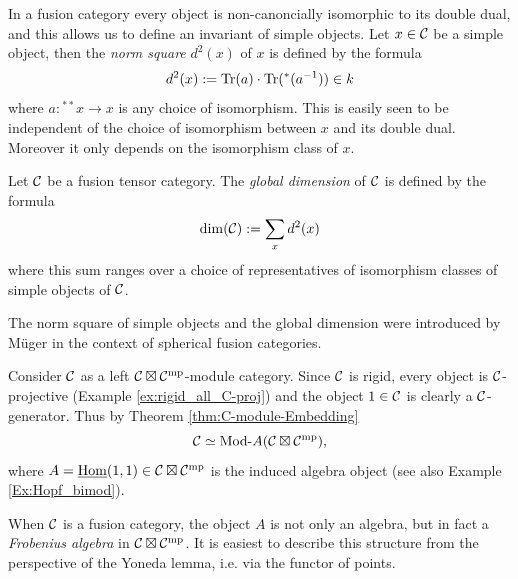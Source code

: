 \documentclass{amsart}
\begin{document}
In a fusion category every object is non-canoncially isomorphic to its double dual, and this allows us to define an invariant of simple objects. Let $x \in \mathcal C$ be a simple object, then the {\em norm square} $d^2(x)$ of $x$ is defined by the formula 
\begin{equation*}
	d^2(x) := \mathrm{Tr}(a) \cdot \mathrm{Tr}({}^*(a^{-1})) \in k
\end{equation*}
where $a: {}^{**}x \to x$ is any choice of isomorphism. This is easily seen to be independent of the choice of isomorphism between $x$ and its double dual. Moreover it only depends on the isomorphism class of $x$. 
\begin{definition}
	Let $\mathcal C$ be a fusion tensor category. The {\em global dimension} of $\mathcal C$ is defined by the formula
	\begin{equation*}
		\dim(\mathcal C) := \sum_{x} d^2(x)
	\end{equation*}
	where this sum ranges over a choice of representatives of isomorphism classes of simple objects of $\mathcal C$. 
\end{definition}
\noindent The norm square of simple objects and the global dimension were introduced by M\"uger \cite{MR1966524} in the context of spherical fusion categories.

Consider $\mathcal C$ as a left $\mathcal C \boxtimes \mathcal C^{\mathrm{mp}}$-module category. Since $\mathcal C$ is rigid, every object is $\mathcal C$-projective (Example \ref{ex:rigid_all_C-proj}) and the object $1 \in \mathcal C$ is clearly a $\mathcal C$-generator. Thus by Theorem \ref{thm:C-module-Embedding} 
\begin{equation*}
	\cC \simeq \Mod{}{A}(\cC \boxtimes \cC^\mp),
\end{equation*}
where  $A = \operatorname{\underline{Hom}}(1,1) \in \mathcal C \boxtimes \mathcal C^{\mathrm{mp}}$ is the induced algebra object (see also Example \ref{Ex:Hopf_bimod}).  

When $\mathcal C$ is a fusion category, the object $A$ is not only an algebra, but in fact a {\em Frobenius algebra} in $\mathcal C \boxtimes \mathcal C^{\mathrm{mp}}$. It is easiest to describe this structure from the perspective of the Yoneda lemma, i.e. via the functor of points. 
\end{document}
